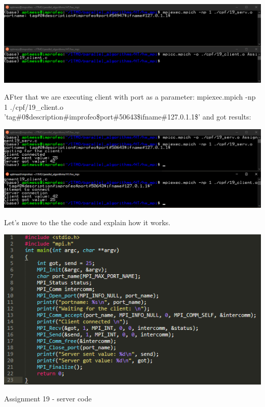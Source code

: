 \documentclass[%
12pt, %
final, %
oneside, %
onecolumn, %
centertags]{article} %
\theoremstyle{plain}
\theoremstyle{definition}
\theoremstyle{remark}
\begin{document}
\begin{center}
\includegraphics[scale=0.5]{19.before.png}
\end{center}

AFter that we are executing client with port as a parameter: mpiexec.mpich -np 1 ./cpf/19\_client.o 'tag\#0\$description\#improfeo\$port\#50643\$ifname\#127.0.1.1\$' and got results:

\begin{center}
\includegraphics[scale=0.5]{19.after.png}
\end{center}

Let's move to the the code and explain how it works.

\begin{center}
\includegraphics[scale=1.1]{19.serv.code.png}

Assignment 19 - server code
\end{center}
\end{document}
